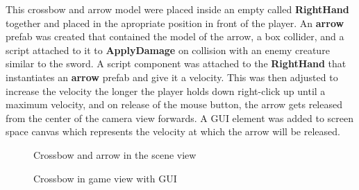 \documentclass[11pt]{report}
\begin{document}
This crossbow and arrow model were placed inside an empty called \textbf{RightHand} together and placed in the apropriate position in front of the player. An \textbf{arrow} prefab was created that contained the model of the arrow, a box collider, and a script attached to it to \textbf{ApplyDamage} on collision with an enemy creature similar to the sword. A script component was attached to the \textbf{RightHand} that instantiates an \textbf{arrow} prefab and give it a velocity. This was then adjusted to increase the velocity the longer the player holds down right-click up until a maximum velocity, and on release of the mouse button, the arrow gets released from the center of the camera view forwards. A GUI element was added to screen space canvas which represents the velocity at which the arrow will be released.
\begin{figure}[H]
    \begin{minipage}{.4\textwidth}
        \centering
        \caption{Crossbow and arrow in the scene view}
    \end{minipage}
    \begin{minipage}{.6\textwidth}
        \centering
        \caption{Crossbow in game view with GUI}
    \end{minipage}
\end{figure}
\end{document}
